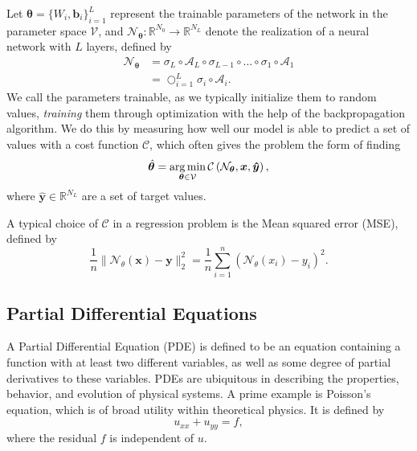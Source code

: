 Let $\boldsymbol{\theta} = \{ W_i, \boldsymbol{b}_i \}_{i = 1}^L$ represent the trainable parameters of the network in the parameter space $\mathcal{V}$, and $\mathcal{N}_{\boldsymbol{\theta}} : \mathbb{R}^{N_0} \to \mathbb{R}^{N_L}$ denote the realization of a neural network with $L$ layers, defined by
\begin{equation}
\begin{split}
    \mathcal{N}_{\boldsymbol{\theta}} &= \sigma_L \circ \mathcal{A}_L \circ \sigma_{L-1} \circ \ldots \circ \sigma_{1} \circ \mathcal{A}_1 \\
    &= \bigcirc_{i = 1}^L \sigma_i \circ \mathcal{A}_i.
\end{split}
\end{equation}
We call the parameters trainable, as we typically initialize them to random values, \textit{training} them through optimization with the help of the backpropagation algorithm.
We do this by measuring how well our model is able to predict a set of values with a cost function $\mathcal{C}$, which often gives the problem the form of finding
\begin{equation}\label{eq:argmintheta}
    \hat{\boldsymbol{\theta}} = \operatorname*{arg\,min}_{\boldsymbol{\theta} \in \mathcal{V}} \mathcal{C} \left( \mathcal{N}_{\boldsymbol{\theta}}, \boldsymbol{x}, \boldsymbol{\hat{y}} \right),
\end{equation}
where $\boldsymbol{\hat{y}} \in \mathbb{R}^{N_L}$ are a set of target values.

A typical choice of $\mathcal{C}$ in a regression problem is the Mean squared error (MSE), defined by
\begin{equation}
    \frac{1}{n} \lVert \mathcal{N}_\theta(\boldsymbol{x}) - \boldsymbol{y} \rVert_2^2
    = \frac{1}{n} \sum_{i = 1}^n (\mathcal{N}_\theta(x_i) - y_i)^2.
\end{equation}



\subsection{Partial Differential Equations}
A Partial Differential Equation (PDE) is defined to be an equation containing a function with at least two different variables, as well as some degree of partial derivatives to these variables.
PDEs are ubiquitous in describing the properties, behavior, and evolution of physical systems.
A prime example is Poisson’s equation, which is of broad utility within theoretical physics. It is defined by
\begin{equation*}
    u_{xx} + u_{yy} = f,
\end{equation*}
where the residual $f$ is independent of $u$.

